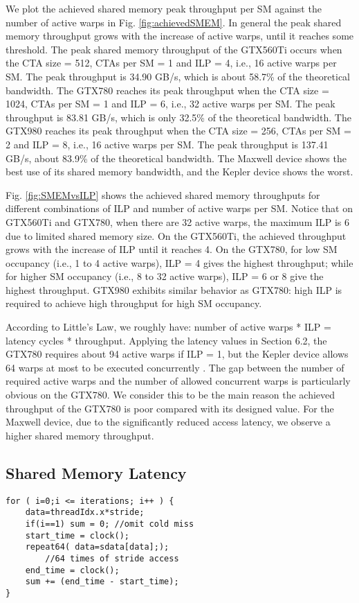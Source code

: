 \documentclass[10pt,journal,compsoc]{IEEEtran}
\theoremstyle{definition}
\begin{document}
We plot the achieved shared memory peak throughput per SM against the number of active warps in Fig. \ref{fig:achievedSMEM}. In general the peak shared memory throughput grows with the increase of active warps, until it reaches some threshold. The peak shared memory throughput of the GTX560Ti occurs when the CTA size = 512, CTAs per SM = 1 and ILP = 4, i.e., 16 active warps per SM. The peak throughput is 34.90 GB/s, which is about 58.7\% of the theoretical bandwidth. The GTX780 reaches its peak throughput when the CTA size = 1024, CTAs per SM = 1 and ILP = 6, i.e., 32 active warps per SM. The peak throughput is 83.81 GB/s, which is only 32.5\% of the theoretical bandwidth. The GTX980 reaches its peak throughput when the CTA size = 256, CTAs per SM = 2 and ILP = 8, i.e., 16 active warps per SM. The peak throughput is 137.41 GB/s, about 83.9\% of the theoretical bandwidth. The Maxwell device shows the best use of its shared memory bandwidth, and the Kepler device shows the worst.

Fig. \ref{fig:SMEMvsILP} shows the achieved shared memory throughputs for different combinations of ILP and number of active warps per SM. Notice that on GTX560Ti and GTX780, when there are 32 active warps, the maximum ILP is 6 due to limited shared memory size. On the GTX560Ti, the achieved throughput grows with the increase of ILP until it reaches 4. On the GTX780, for low SM occupancy (i.e., 1 to 4 active warps), ILP = 4 gives the highest throughput; while for higher SM occupancy (i.e., 8 to 32 active warps), ILP = 6 or 8 give the highest throughput. GTX980 exhibits similar behavior as GTX780: high ILP is required to achieve high throughput for high SM occupancy.

According to Little's Law, we roughly have: number of active warps * ILP = latency cycles * throughput. Applying the latency values in Section 6.2, the GTX780 requires about 94 active warps if ILP = 1, but the Kepler device allows 64 warps at most to be executed concurrently \cite{cudacprogrammingguide}. The gap between the number of required active warps and the number of allowed concurrent warps is particularly obvious on the GTX780. We consider this to be the main reason the achieved throughput of the GTX780 is poor compared with its designed value. For the Maxwell device, due to the significantly reduced access latency, we observe a higher shared memory throughput.


\subsection{Shared Memory Latency}
\renewcommand{\thelstlisting}{\arabic{lstlisting}}
\begin{lstlisting}[caption={Kernel function of shared memory stride access},label={list_shared}]
for ( i=0;i <= iterations; i++ ) {
    data=threadIdx.x*stride;
    if(i==1) sum = 0; //omit cold miss
    start_time = clock();
    repeat64( data=sdata[data];);
        //64 times of stride access
    end_time = clock();
    sum += (end_time - start_time);
}
\end{lstlisting}
\end{document}
